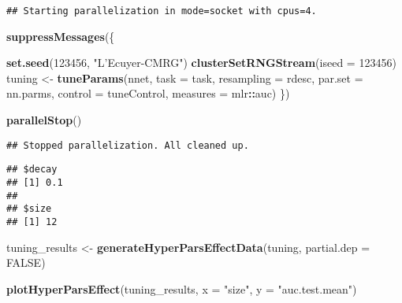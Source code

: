 \documentclass[
]{article}
\newenvironment{Shaded}{\begin{snugshade}}{\end{snugshade}}
\newcommand{\CommentTok}[1]{\textcolor[rgb]{0.56,0.35,0.01}{\textit{#1}}}
\newcommand{\DataTypeTok}[1]{\textcolor[rgb]{0.13,0.29,0.53}{#1}}
\newcommand{\DecValTok}[1]{\textcolor[rgb]{0.00,0.00,0.81}{#1}}
\newcommand{\KeywordTok}[1]{\textcolor[rgb]{0.13,0.29,0.53}{\textbf{#1}}}
\newcommand{\NormalTok}[1]{#1}
\newcommand{\OperatorTok}[1]{\textcolor[rgb]{0.81,0.36,0.00}{\textbf{#1}}}
\newcommand{\OtherTok}[1]{\textcolor[rgb]{0.56,0.35,0.01}{#1}}
\newcommand{\StringTok}[1]{\textcolor[rgb]{0.31,0.60,0.02}{#1}}
\begin{document}
\begin{verbatim}
## Starting parallelization in mode=socket with cpus=4.
\end{verbatim}

\begin{Shaded}
\begin{Highlighting}[]
\KeywordTok{suppressMessages}\NormalTok{(\{}

  \KeywordTok{set.seed}\NormalTok{(}\DecValTok{123456}\NormalTok{, }\StringTok{"L'Ecuyer-CMRG"}\NormalTok{)}
  \KeywordTok{clusterSetRNGStream}\NormalTok{(}\DataTypeTok{iseed =} \DecValTok{123456}\NormalTok{)}
\NormalTok{  tuning <-}\StringTok{ }\KeywordTok{tuneParams}\NormalTok{(nnet, }\DataTypeTok{task =}\NormalTok{ task, }\DataTypeTok{resampling =}\NormalTok{ rdesc, }\DataTypeTok{par.set =}\NormalTok{ nn.parms, }\DataTypeTok{control =}\NormalTok{ tuneControl,}
                     \DataTypeTok{measures =}\NormalTok{ mlr}\OperatorTok{::}\NormalTok{auc)}
\NormalTok{\})}

\KeywordTok{parallelStop}\NormalTok{()}
\end{Highlighting}
\end{Shaded}

\begin{verbatim}
## Stopped parallelization. All cleaned up.
\end{verbatim}

\begin{Shaded}
\end{Shaded}

\begin{verbatim}
## $decay
## [1] 0.1
## 
## $size
## [1] 12
\end{verbatim}

\begin{Shaded}
\begin{Highlighting}[]
\NormalTok{tuning_results <-}\StringTok{ }\KeywordTok{generateHyperParsEffectData}\NormalTok{(tuning, }\DataTypeTok{partial.dep =} \OtherTok{FALSE}\NormalTok{)}

\KeywordTok{plotHyperParsEffect}\NormalTok{(tuning_results, }\DataTypeTok{x =} \StringTok{"size"}\NormalTok{, }\DataTypeTok{y =} \StringTok{"auc.test.mean"}\NormalTok{)}
\end{Highlighting}
\end{Shaded}
\end{document}
